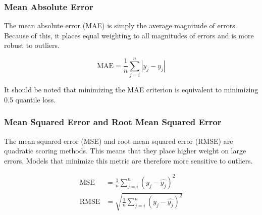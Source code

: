 \documentclass[a4paper, table]{article}
\begin{document}
\subsubsection{Mean Absolute Error}

The mean absolute error (MAE) is simply the average magnitude of errors. Because of this, it places equal weighting to all magnitudes of errors and is more robust to outliers. 

\begin{equation}
	\text{MAE} = \frac{1}{n} \sum_{j = i}^{n} |y_j - \hat{y_j}|
\end{equation}

It should be noted that minimizing the MAE criterion is equivalent to minimizing 0.5 quantile loss. 

\subsubsection{Mean Squared Error and Root Mean Squared Error}

The mean squared error (MSE) and root mean squared error (RMSE) are quadratic scoring methods. This means that they place higher weight on large errors. Models that minimize this metric are therefore more sensitive to outliers. 

\begin{align}
	\text{MSE} &= \frac{1}{n} \sum_{j = i}^{n} \left( y_j - \hat{y_j}\right) ^2 \\
	\text{RMSE} &= \sqrt{ \frac{1}{n} \sum_{j = i}^{n} \left( y_j - \hat{y_j}\right) ^2}
\end{align}

\end{document}
